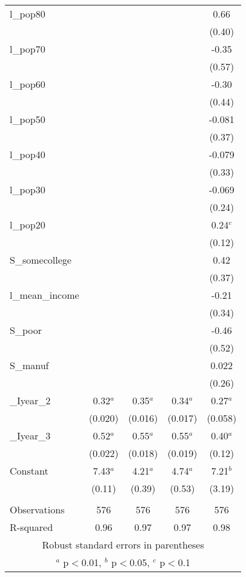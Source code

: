 \documentclass[]{article}
\begin{document}
\begin{tabular}{lcccc}
l\_pop80 &  &  &  & 0.66 \\
 &  &  &  & (0.40) \\
l\_pop70 &  &  &  & -0.35 \\
 &  &  &  & (0.57) \\
l\_pop60 &  &  &  & -0.30 \\
 &  &  &  & (0.44) \\
l\_pop50 &  &  &  & -0.081 \\
 &  &  &  & (0.37) \\
l\_pop40 &  &  &  & -0.079 \\
 &  &  &  & (0.33) \\
l\_pop30 &  &  &  & -0.069 \\
 &  &  &  & (0.24) \\
l\_pop20 &  &  &  & 0.24$^c$ \\
 &  &  &  & (0.12) \\
S\_somecollege &  &  &  & 0.42 \\
 &  &  &  & (0.37) \\
l\_mean\_income &  &  &  & -0.21 \\
 &  &  &  & (0.34) \\
S\_poor &  &  &  & -0.46 \\
 &  &  &  & (0.52) \\
S\_manuf &  &  &  & 0.022 \\
 &  &  &  & (0.26) \\
\_Iyear\_2 & 0.32$^a$ & 0.35$^a$ & 0.34$^a$ & 0.27$^a$ \\
 & (0.020) & (0.016) & (0.017) & (0.058) \\
\_Iyear\_3 & 0.52$^a$ & 0.55$^a$ & 0.55$^a$ & 0.40$^a$ \\
 & (0.022) & (0.018) & (0.019) & (0.12) \\
Constant & 7.43$^a$ & 4.21$^a$ & 4.74$^a$ & 7.21$^b$ \\
 & (0.11) & (0.39) & (0.53) & (3.19) \\
 &  &  &  &  \\
Observations & 576 & 576 & 576 & 576 \\
 R-squared & 0.96 & 0.97 & 0.97 & 0.98 \\ \hline
\multicolumn{5}{c}{ Robust standard errors in parentheses} \\
\multicolumn{5}{c}{ $^a$ p$<$0.01, $^b$ p$<$0.05, $^c$ p$<$0.1} \\
\end{tabular}
\end{document}
